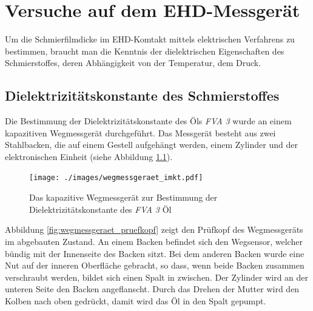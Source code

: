 \chapter{Versuche auf dem EHD-Messgerät}
\label{chap:versuche_auf_dem_ehd_messgeraet}

Um die Schmierfilmdicke im EHD-Komtakt mittels elektrischen Verfahrens zu bestimmen, braucht man die Kenntnis der dielektrischen Eigenschaften des Schmierstoffes, deren Abhängigkeit von der Temperatur, dem Druck.

\section{Dielektrizitätskonstante des Schmierstoffes}
\label{sec:dielektrizitaetskonstate_des_schmierstoffes}


Die Bestimmung der Dielektrizitätskonstante des Öls \textit{FVA 3} wurde an einem kapazitiven Wegmessgerät durchgeführt.
Das Messgerät besteht aus zwei Stahlbacken, die auf einem Gestell aufgehängt werden, einem Zylinder und der elektronischen Einheit (siehe Abbildung \ref{fig:das_kapazitive_wegmessgeraet}).

\begin{figure}[htb]
    \centering
    \texttt{[image: ./images/wegmessgeraet\_imkt.pdf]}
    \caption{Das kapazitive Wegmessgerät zur Bestimmung der Dielektrizitätskonstante des \textit{FVA 3} Öl}
    \label{fig:das_kapazitive_wegmessgeraet}
\end{figure}

Abbildung \ref{fig:wegmessgeraet_pruefkopf} zeigt den Prüfkopf des Wegmessgeräts im abgebauten Zustand.
An einem Backen befindet sich den Wegsensor, welcher bündig mit der Innenseite des Backen sitzt.
Bei dem anderen Backen wurde eine Nut auf der inneren Oberfläche gebracht, so dass, wenn beide Backen zusammen verschraubt werden, bildet sich einen Spalt in zwischen.
Der Zylinder wird an der unteren Seite den Backen angeflanscht.
Durch das Drehen der Mutter wird den Kolben nach oben gedrückt, damit wird das Öl in den Spalt gepumpt.

